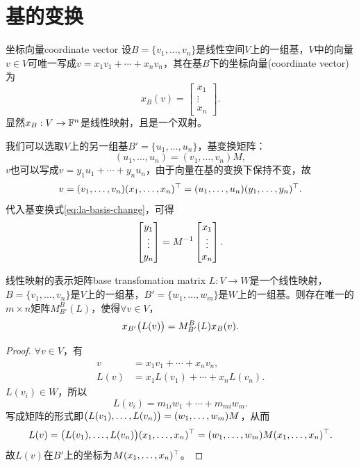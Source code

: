 \section{基的变换}
\begin{definition}{坐标向量}{coordinate vector}
	设$B = \{v_1,\ldots,v_n\}$是线性空间$V$上的一组基，$V$中的向量$v \in V$可唯一写成$v = x_1v_1 + \cdots + x_nv_n$，其在基$B$下的坐标向量(coordinate vector)为
	\begin{equation}\label{eq:la-coordinate-vector}
		x_B(v) = \begin{bmatrix}
			x_1\\\vdots\\x_n
		\end{bmatrix}.
	\end{equation}
	显然$x_B:V \to \mathbb{F}^n$是线性映射，且是一个双射。
\end{definition}
我们可以选取$V$上的另一组基$B' = \{u_1,\ldots,u_n\}$，基变换矩阵：
\begin{equation}\label{eq:la-basis-change}
	(u_1,\ldots,u_n) = (v_1,\ldots,v_n)M,
\end{equation}
$v$也可以写成$v = y_1u_1 + \cdots + y_nu_n$，由于向量在基的变换下保持不变，故
\[
	v = (v_1,\ldots,v_n)(x_1,\ldots,x_n)^\top = (u_1,\ldots,u_n)(y_1,\ldots,y_n)^\top.
\]
代入基变换式\eqref{eq:la-basis-change}，可得
\begin{equation}\label{eq:la-inverse-coordinate-change}
	\begin{bmatrix}
		y_1\\\vdots\\y_n
	\end{bmatrix} = M^{-1}\begin{bmatrix}
		x_1\\\vdots\\x_n
	\end{bmatrix}.
\end{equation}
\begin{theorem}{线性映射的表示矩阵}{base transfomation matrix}
	$L:V \to W$是一个线性映射，$B = \{v_1,\ldots,v_n\}$是$V$上的一组基，$B' = \{w_1,\ldots,w_m\}$是$W$上的一组基。则存在唯一的$m \times n$矩阵$M_{B'}^B(L)$，使得$\forall v \in V$，
	\begin{equation}\label{eq:la-matrix-representation}
		x_{B'}\bigl(L(v)\bigr) = M_{B'}^B(L)x_B(v).
	\end{equation}
\end{theorem}
\begin{proof}
	$\forall v \in V$，有
	\begin{align*}
		v &= x_1v_1 + \cdots + x_nv_n,\\
		L(v) &= x_1L(v_1) + \cdots + x_nL(v_n).
	\end{align*}
	$L(v_i) \in W$，所以
	\[
		L(v_i) = m_{1i}w_1 + \cdots + m_{mi}w_m.
	\]
	写成矩阵的形式即$\bigl(L(v_1),\ldots,L(v_n)\bigr) = (w_1,\ldots,w_m)M$，从而
	\[
		L(v) = \bigl(L(v_1),\ldots,L(v_n)\bigr)(x_1,\ldots,x_n)^\top = (w_1,\ldots,w_m)M(x_1,\ldots,x_n)^\top.
	\]
	故$L(v)$在$B'$上的坐标为$M(x_1,\ldots,x_n)^\top$。
\end{proof}

